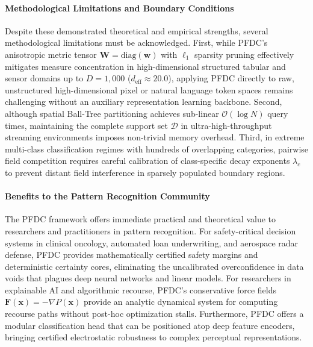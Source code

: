 \documentclass[times, review, 10pt]{elsarticle}
\begin{document}
\paragraph{Methodological Limitations and Boundary Conditions}
Despite these demonstrated theoretical and empirical strengths, several methodological limitations must be acknowledged. First, while PFDC's anisotropic metric tensor $\mathbf{W} = \mathrm{diag}(\mathbf{w})$ with $\ell_1$ sparsity pruning effectively mitigates measure concentration in high-dimensional structured tabular and sensor domains up to $D=1,000$ ($d_{\mathrm{eff}} \approx 20.0$), applying PFDC directly to raw, unstructured high-dimensional pixel or natural language token spaces remains challenging without an auxiliary representation learning backbone. Second, although spatial Ball-Tree partitioning achieves sub-linear $\mathcal{O}(\log N)$ query times, maintaining the complete support set $\mathcal{D}$ in ultra-high-throughput streaming environments imposes non-trivial memory overhead. Third, in extreme multi-class classification regimes with hundreds of overlapping categories, pairwise field competition requires careful calibration of class-specific decay exponents $\lambda_c$ to prevent distant field interference in sparsely populated boundary regions.

\paragraph{Benefits to the Pattern Recognition Community}
The PFDC framework offers immediate practical and theoretical value to researchers and practitioners in pattern recognition. For safety-critical decision systems in clinical oncology, automated loan underwriting, and aerospace radar defense, PFDC provides mathematically certified safety margins and deterministic certainty cores, eliminating the uncalibrated overconfidence in data voids that plagues deep neural networks and linear models. For researchers in explainable AI and algorithmic recourse, PFDC's conservative force fields $\mathbf{F}(\mathbf{x}) = -\nabla P(\mathbf{x})$ provide an analytic dynamical system for computing recourse paths without post-hoc optimization stalls. Furthermore, PFDC offers a modular classification head that can be positioned atop deep feature encoders, bringing certified electrostatic robustness to complex perceptual representations.
\end{document}
